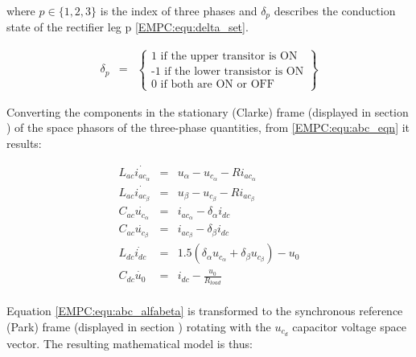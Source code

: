     where $p\in\{1,2,3\}$ is the index of three phases and $\delta_p$ describes the conduction state of the rectifier leg p \ref{EMPC:equ:delta_set}.

    \begin{equation}
        \begin{array}{rcl}
            \delta_p&=&\begin{Bmatrix}
                \textrm{1 if the upper transitor is ON}\\
                \textrm{-1 if the lower transistor is ON}\\
                \textrm{0 if both are ON or OFF}
            \end{Bmatrix}
        \end{array}
        \label{EMPC:equ:delta_set}
    \end{equation}

    Converting the components in the stationary (Clarke) frame (displayed in section ) of the space phasors of the three-phase quantities, from \ref{EMPC:equ:abc_eqn} it results:

    \begin{equation}
        \begin{array}{rcl}
            L_{ac}\dot{i_{ac_\alpha}}&=&u_\alpha-u_{c_\alpha}-Ri_{ac_\alpha}\\
            L_{ac}\dot{i_{ac_\beta}}&=&u_\beta-u_{c_\beta}-Ri_{ac_\beta}\\
            C_{ac}\dot{u_{c_\alpha}}&=&i_{ac_\alpha}-\delta_\alpha i_{dc}\\
            C_{ac}\dot{u_{c_\beta}}&=&i_{ac_\beta}-\delta_\beta i_{dc}\\
            L_{dc}\dot{i_{dc}}&=&1.5(\delta_\alpha u_{c_\alpha}+\delta_\beta u_{c_\beta})-u_0\\
            C_{dc}\dot{u_0}&=&i_{dc}-\frac{u_0}{R_{load}}\\
        \end{array}
        \label{EMPC:equ:abc_alfabeta}
    \end{equation}

    Equation \ref{EMPC:equ:abc_alfabeta} is transformed to the synchronous reference (Park) frame (displayed in section ) rotating with the $u_{c_d}$ capacitor voltage space vector. The resulting mathematical model is thus:

